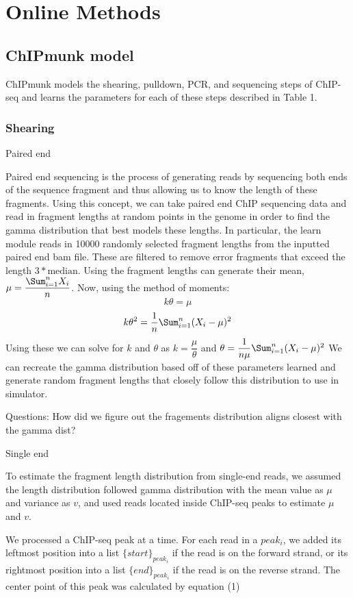\documentclass[12pt]{article}
\begin{document}
\section*{Online Methods}

\subsection*{ChIPmunk model}

ChIPmunk models the shearing, pulldown, PCR, and sequencing steps of ChIP-seq and learns the parameters for each of these steps described in Table 1. 

\subsubsection*{Shearing}

Paired end

Paired end sequencing is the process of generating reads by sequencing both ends of the sequence fragment and thus allowing us to know the length of these fragments. Using this concept, we can take paired end ChIP sequencing data and read in fragment lengths at random points in the genome in order to find the gamma distribution that best models these lengths. In particular, the learn module reads in 10000 randomly selected fragment lengths from the inputted paired end bam file. These are filtered to remove error fragments that exceed the length $3 * \text{median}$. Using the fragment lengths can generate their mean, $\mu = \dfrac{\Sum_{i=1}^{n}X_i}{n}$. Now, using the method of moments: 
$$k\theta = \mu$$
$$k{\theta}^2 = \dfrac{1}{n}\Sum_{i=1}^n(X_i - \mu)^2$$  
Using these we can solve for $k$ and $\theta$ as $k = \dfrac{\mu}{\theta}$ and $\theta = \dfrac{1}{n\mu}\Sum_{i=1}^{n}(X_i - \mu)^2$
We can recreate the gamma distribution based off of these parameters learned and generate random fragment lengths that closely follow this distribution to use in simulator.

Questions: How did we figure out the fragements distribution aligns closest with the gamma dist?

Single end

To estimate the fragment length distribution from single-end reads, we assumed the length distribution followed gamma distribution with the mean value as $\mu$ and variance as $v$, and used reads located inside ChIP-seq peaks to estimate $\mu$ and $v$.

We processed a ChIP-seq peak at a time. For each read in a $peak_i$, we added its leftmost position into a list $\{start\}_{peak_i}$ if the read is on the forward strand, or its rightmost position into a list $\{end\}_{peak_i}$ if the read is on the reverse strand. The center point of this peak was calculated by equation (1)
\end{document}
